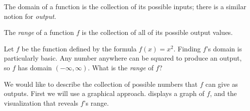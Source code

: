 The domain of a function is the collection of its possible inputs; there is a similar notion for \emph{output}.
\begin{pccdefinition}[Range]
The \emph{range} of a function $f$ is the collection of all of its possible output values.
\end{pccdefinition}
\begin{pccexample}\label{fun:ex:range}
Let $f$ be the function defined by the formula $f(x)=x^2$. Finding $f$'s domain is particularly basic. Any number anywhere can be squared to produce an output, so $f$ has domain $(-\infty,\infty)$. What is the \emph{range} of $f$?
\begin{pccsolution}
We would like to describe the collection of possible numbers that $f$ can give as outputs. 
First we will use a graphical approach.  displays a graph of $f$, and the visualization that reveals $f$'s range.
\begin{figure}[!htb]
	\begin{widepage}
	\centering
    \begin{subfigure}{.3\textwidth}
    \caption{}
    \label{fun:fig:rangeexamplesetup}
    \end{subfigure}%
    \hfill
    \begin{subfigure}{.3\textwidth}
\end{subfigure}
\end{widepage}
\end{figure}
\end{pccsolution}
\end{pccexample}
